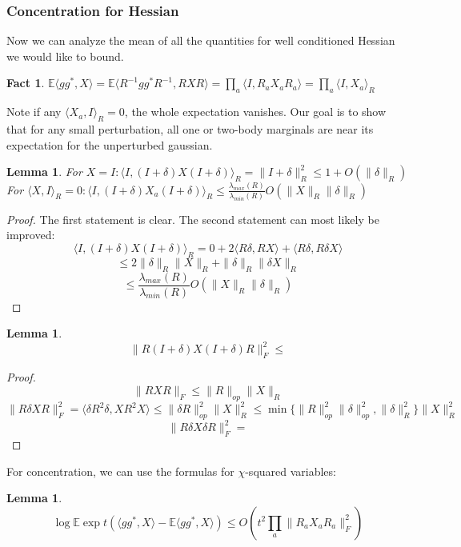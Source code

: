\documentclass{article}
\newtheorem{lemma}[theorem]{Lemma}
\newtheorem{fact}[theorem]{Fact}
\newcommand{\E}{\mathbb{E}}
\begin{document}
\subsubsection{Concentration for Hessian}
Now we can analyze the mean of all the quantities for well conditioned Hessian we would like to bound. 

\begin{fact}
$ \E \langle g g^{*}, X \rangle = \E \langle R^{-1} g g^{*} R^{-1}, R X R \rangle = \prod_{a} \langle I, R_{a} X_{a} R_{a} \rangle = \prod_{a} \langle I, X_{a} \rangle_{R} $
\end{fact}

Note if any $\langle X_{a}, I \rangle_{R} = 0$, the whole expectation vanishes. Our goal is to show that for any small perturbation, all one or two-body marginals are near its expectation for the unperturbed gaussian. 

\begin{lemma}
For $X = I: \langle I, (I + \delta)X(I+\delta) \rangle_{R} = \|I+\delta\|_{R}^{2} \leq 1 + O(\|\delta\|_{R})$
\\ For $\langle X, I \rangle_{R} = 0: \langle I, (I + \delta)X_{a}(I+\delta) \rangle_{R} \leq \frac{\lambda_{max}(R)}{\lambda_{min}(R)} O( \|X\|_{R} \|\delta\|_{R} )$
\end{lemma}
\begin{proof}
The first statement is clear. The second statement can most likely be improved:
\[ \langle I, (I + \delta)X(I+\delta) \rangle_{R} = 0 + 2 \langle R \delta, R X \rangle + \langle R \delta, R \delta X \rangle  \]
\[ \leq 2 \|\delta\|_{R} \|X\|_{R} + \|\delta\|_{R} \|\delta X\|_{R}   \]
\[ \leq  \frac{\lambda_{max}(R)}{\lambda_{min}(R)} O( \|X\|_{R} \|\delta\|_{R} )   \]
\end{proof}

\begin{lemma}
\[ \|R (I+\delta) X (I+\delta) R\|_{F}^{2} \leq     \]
\end{lemma}
\begin{proof}
\[ \|RXR\|_{F} \leq \|R\|_{op} \|X\|_{R}   \]
\[ \|R \delta X R\|_{F}^{2} = \langle \delta R^{2} \delta, X R^{2} X \rangle \leq \|\delta R\|_{op}^{2} \|X\|_{R}^{2} \leq \min\{\|R\|_{op}^{2} \|\delta\|_{op}^{2},  \|\delta\|_{R}^{2}\} \|X\|_{R}^{2}    \]
\[ \|R \delta X \delta R\|_{F}^{2} =    \]
\end{proof}

For concentration, we can use the formulas for $\chi$-squared variables:

\begin{lemma}
\[ \log \E \exp t( \langle g g^{*}, X \rangle - \E \langle g g^{*}, X \rangle ) \leq O \left( t^{2} \prod_{a} \|R_{a} X_{a} R_{a}\|_{F}^{2}  \right)  \]
\end{lemma}
\end{document}
